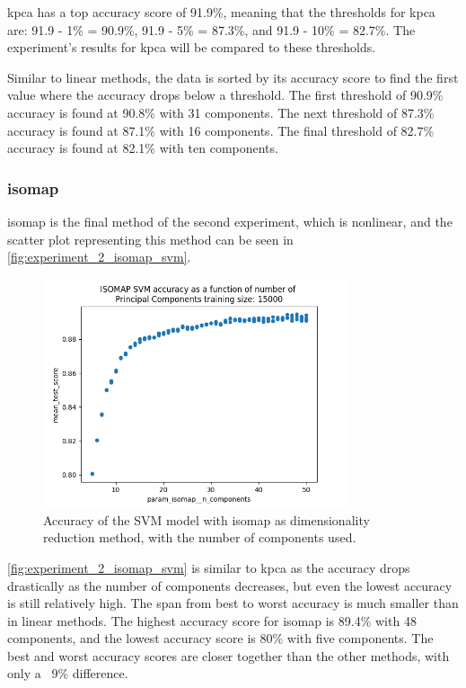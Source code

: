 \gls{kpca} has a top accuracy score of 91.9\%, meaning that the thresholds for \gls{kpca} are: 91.9 - 1\% = 90.9\%, 91.9 - 5\% = 87.3\%, and 91.9 - 10\% = 82.7\%. The experiment's results for \gls{kpca} will be compared to these thresholds.

Similar to linear methods, the data is sorted by its accuracy score to find the first value where the accuracy drops below a threshold. The first threshold of 90.9\% accuracy is found at 90.8\% with 31 components. The next threshold of 87.3\% accuracy is found at 87.1\% with 16 components. The final threshold of 82.7\% accuracy is found at 82.1\% with ten components.


\subsubsection{\gls{isomap}}\label{subsubsec:experiment_2_isomap}
\gls{isomap} is the final method of the second experiment, which is nonlinear, and the scatter plot representing this method can be seen in \autoref{fig:experiment_2_isomap_svm}.

\begin{figure}[htb!]
    \centering
    \includegraphics[width=0.8\textwidth]{figures/experiment_two/isomap_rerun_svm_15000.png}
    \caption{Accuracy of the SVM model with \gls{isomap} as dimensionality reduction method, with the number of components used.}
    \label{fig:experiment_2_isomap_svm}
\end{figure}

\autoref{fig:experiment_2_isomap_svm} is similar to \gls{kpca} as the accuracy drops drastically as the number of components decreases, but even the lowest accuracy is still relatively high. The span from best to worst accuracy is much smaller than in linear methods. The highest accuracy score for \gls{isomap}  is 89.4\% with 48 components, and the lowest accuracy score is 80\% with five components. The best and worst accuracy scores are closer together than the other methods, with only a ~9\% difference.

